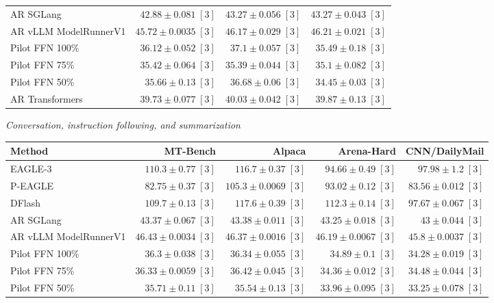\begin{table}[!htp]
\begin{tabular}{@{}>{\raggedright\arraybackslash}p{3.7cm}rrr@{}}
AR \textperiodcentered{} SGLang & \(42.88 \pm 0.081\;[3]\) & \(43.27 \pm 0.056\;[3]\) & \(43.27 \pm 0.043\;[3]\) \\
AR \textperiodcentered{} vLLM ModelRunnerV1 & \(45.72 \pm 0.0035\;[3]\) & \(46.17 \pm 0.029\;[3]\) & \(46.21 \pm 0.021\;[3]\) \\
Pilot FFN 100\% & \(36.12 \pm 0.052\;[3]\) & \(37.1 \pm 0.057\;[3]\) & \(35.49 \pm 0.18\;[3]\) \\
Pilot FFN 75\% & \(35.42 \pm 0.064\;[3]\) & \(35.39 \pm 0.044\;[3]\) & \(35.1 \pm 0.082\;[3]\) \\
Pilot FFN 50\% & \(35.66 \pm 0.13\;[3]\) & \(36.68 \pm 0.06\;[3]\) & \(34.45 \pm 0.03\;[3]\) \\
AR \textperiodcentered{} Transformers & \(39.73 \pm 0.077\;[3]\) & \(40.03 \pm 0.042\;[3]\) & \(39.87 \pm 0.13\;[3]\) \\
\bottomrule
\end{tabular}\par\medskip
\textit{Conversation, instruction following, and summarization}\par\smallskip
\begin{tabular}{@{}>{\raggedright\arraybackslash}p{3.7cm}rrrr@{}}
\toprule
Method & MT-Bench & Alpaca & Arena-Hard & CNN/DailyMail \\
\midrule
EAGLE-3 & \(\mathbf{110.3} \pm 0.77\;[3]\) & \(116.7 \pm 0.37\;[3]\) & \(94.66 \pm 0.49\;[3]\) & \(\mathbf{97.98} \pm 1.2\;[3]\) \\
P-EAGLE & \(82.75 \pm 0.37\;[3]\) & \(105.3 \pm 0.0069\;[3]\) & \(93.02 \pm 0.12\;[3]\) & \(83.56 \pm 0.012\;[3]\) \\
DFlash & \(109.7 \pm 0.13\;[3]\) & \(\mathbf{117.6} \pm 0.39\;[3]\) & \(\mathbf{112.3} \pm 0.14\;[3]\) & \(97.67 \pm 0.067\;[3]\) \\
AR \textperiodcentered{} SGLang & \(43.37 \pm 0.067\;[3]\) & \(43.38 \pm 0.011\;[3]\) & \(43.25 \pm 0.018\;[3]\) & \(43 \pm 0.044\;[3]\) \\
AR \textperiodcentered{} vLLM ModelRunnerV1 & \(46.43 \pm 0.0034\;[3]\) & \(46.37 \pm 0.0016\;[3]\) & \(46.19 \pm 0.0067\;[3]\) & \(45.8 \pm 0.0037\;[3]\) \\
Pilot FFN 100\% & \(36.3 \pm 0.038\;[3]\) & \(36.34 \pm 0.055\;[3]\) & \(34.89 \pm 0.1\;[3]\) & \(34.28 \pm 0.019\;[3]\) \\
Pilot FFN 75\% & \(36.33 \pm 0.0059\;[3]\) & \(36.42 \pm 0.045\;[3]\) & \(34.36 \pm 0.012\;[3]\) & \(34.48 \pm 0.044\;[3]\) \\
Pilot FFN 50\% & \(35.71 \pm 0.11\;[3]\) & \(35.54 \pm 0.13\;[3]\) & \(33.96 \pm 0.095\;[3]\) & \(33.25 \pm 0.078\;[3]\) \\

\end{tabular}
\end{table}
